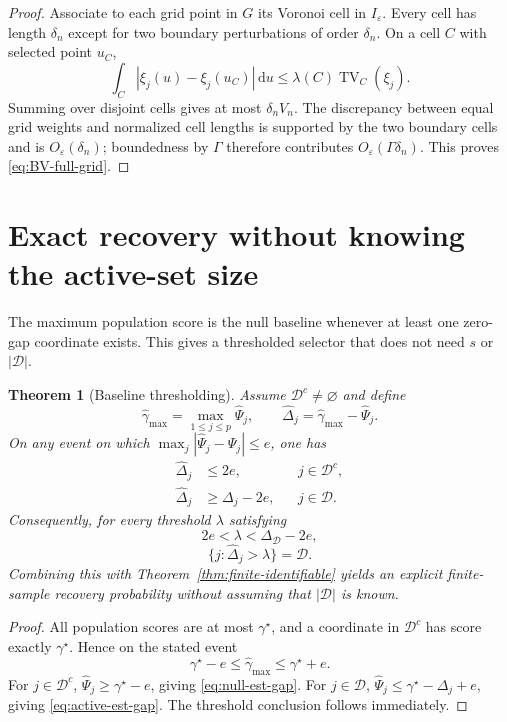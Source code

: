 \documentclass[11pt]{article}
\newtheorem{theorem}{Theorem}[section]
\theoremstyle{definition}\newtheorem{definition}[theorem]{Definition}
\newcommand{\I}{I_\varepsilon}
\newcommand{\gmax}{\gamma^\star}
\newcommand{\D}{\mathcal D}
\newcommand{\TV}{\operatorname{TV}}
\begin{document}
\begin{proof}
Associate to each grid point in $G$ its Voronoi cell in $\I$.  Every cell has
length $\delta_n$ except for two boundary perturbations of order $\delta_n$.
On a cell $C$ with selected point $u_C$,
\[
 \int_C|\xi_j(u)-\xi_j(u_C)|\,\mathrm du
 \le\lambda(C)\TV_C(\xi_j).
\]
Summing over disjoint cells gives at most $\delta_nV_n$.  The discrepancy
between equal grid weights and normalized cell lengths is supported by the
two boundary cells and is $O_\varepsilon(\delta_n)$; boundedness by $\Gamma$
therefore contributes $O_\varepsilon(\Gamma\delta_n)$.  This proves
\eqref{eq:BV-full-grid}.
\end{proof}

\section{Exact recovery without knowing the active-set size}

The maximum population score is the null baseline whenever at least one
zero-gap coordinate exists.  This gives a thresholded selector that does not
need $s$ or $|\D|$.

\begin{theorem}[Baseline thresholding]
\label{thm:baseline-threshold}
Assume $\D^c\ne\varnothing$ and define
\[
 \widehat\gamma_{\max}=\max_{1\le j\le p}\widehat\Psi_j,
 \qquad
 \widehat\Delta_j=\widehat\gamma_{\max}-\widehat\Psi_j.
\]
On any event on which
$\max_j|\widehat\Psi_j-\Psi_j|\le e$, one has
\begin{align}
 \widehat\Delta_j&\le2e, &&j\in\D^c,
 \label{eq:null-est-gap}\\
 \widehat\Delta_j&\ge\Delta_j-2e, &&j\in\D.
 \label{eq:active-est-gap}
\end{align}
Consequently, for every threshold $\lambda$ satisfying
\begin{equation}
 2e<\lambda<\Delta_{\D}-2e,
 \label{eq:threshold-window}
\end{equation}
\[
 \{j:\widehat\Delta_j>\lambda\}=\D.
\]
Combining this with Theorem~\ref{thm:finite-identifiable} yields an explicit
finite-sample recovery probability without assuming that $|\D|$ is known.
\end{theorem}

\begin{proof}
All population scores are at most $\gmax$, and a coordinate in $\D^c$ has
score exactly $\gmax$.  Hence on the stated event
\[
 \gmax-e\le\widehat\gamma_{\max}\le\gmax+e.
\]
For $j\in\D^c$, $\widehat\Psi_j\ge\gmax-e$, giving
\eqref{eq:null-est-gap}.  For $j\in\D$,
$\widehat\Psi_j\le\gmax-\Delta_j+e$, giving
\eqref{eq:active-est-gap}.  The threshold conclusion follows immediately.
\end{proof}
\end{document}
